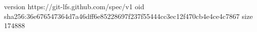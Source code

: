 version https://git-lfs.github.com/spec/v1
oid sha256:36e676547364d7a46dff6e85228697f237f55444cc3ec12f470cb4e4ce4c7867
size 174888
